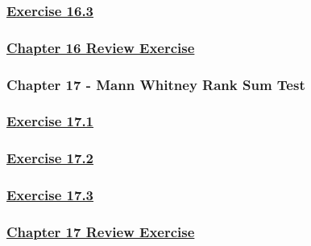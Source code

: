 \documentclass[
  11pt,
]{book}
\begin{document}
\subsubsection*{\texorpdfstring{\hyperref[ex163q]{Exercise 16.3}}{Exercise 16.3}}\label{exercise-16.3-1}

\subsubsection*{\texorpdfstring{\hyperref[re16q]{Chapter 16 Review Exercise}}{Chapter 16 Review Exercise}}\label{chapter-16-review-exercise}

\subsubsection*{Chapter 17 - Mann Whitney Rank Sum Test}\label{chapter-17---mann-whitney-rank-sum-test}

\subsubsection*{\texorpdfstring{\hyperref[ex171q]{Exercise 17.1}}{Exercise 17.1}}\label{exercise-17.1-1}

\subsubsection*{\texorpdfstring{\hyperref[ex172q]{Exercise 17.2}}{Exercise 17.2}}\label{exercise-17.2-1}

\subsubsection*{\texorpdfstring{\hyperref[ex173q]{Exercise 17.3}}{Exercise 17.3}}\label{exercise-17.3-1}

\subsubsection*{\texorpdfstring{\hyperref[re17q]{Chapter 17 Review Exercise}}{Chapter 17 Review Exercise}}\label{chapter-17-review-exercise}
\end{document}
